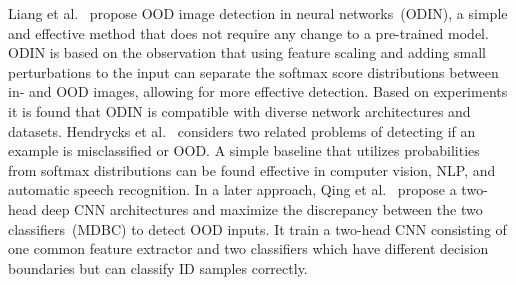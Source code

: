 \hspace*{3.5mm} Liang et al.~\cite{OOD13} propose OOD image detection in neural networks~(ODIN), a simple and effective method that does not require any change to a pre-trained model. ODIN is based on the observation that using feature scaling and adding small perturbations to the input can separate the softmax score distributions between in- and OOD images, allowing for more effective detection. Based on experiments it is found that ODIN is compatible with diverse network architectures and datasets. Hendrycks et al.~\cite{OOD17} considers two related problems of detecting if an example is misclassified or OOD. A simple baseline that utilizes probabilities from softmax distributions can be found effective in computer vision, NLP, and automatic speech recognition. In a later approach, Qing et al.~\cite{OOD19} propose a two-head deep CNN architectures and maximize the discrepancy between the two classifiers~(MDBC) to detect OOD inputs. It train a two-head CNN consisting of one common feature extractor and two classifiers which have different decision boundaries but can classify ID samples correctly. 

